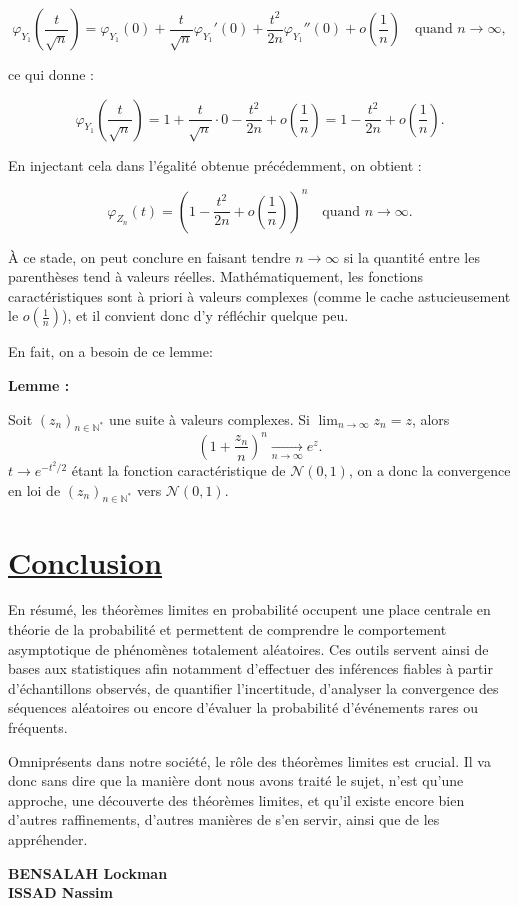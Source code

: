 \documentclass{article}
\begin{document}
\[
\varphi_{Y_1}\left(\frac{t}{\sqrt{n}}\right) = \varphi_{Y_1}(0) + \frac{t}{\sqrt{n}} \varphi_{Y_1}'(0) + \frac{t^2}{2n} \varphi_{Y_1}''(0) + o\left(\frac{1}{n}\right) \quad \text{quand } n \to \infty,
\]

ce qui donne :

\[
\varphi_{Y_1}\left(\frac{t}{\sqrt{n}}\right) = 1 + \frac{t}{\sqrt{n}} \cdot 0 - \frac{t^2}{2n} + o\left(\frac{1}{n}\right) = 1 - \frac{t^2}{2n} + o\left(\frac{1}{n}\right).
\]

En injectant cela dans l'égalité obtenue précédemment, on obtient :

\[
\varphi_{Z_n}(t) = \left( 1 - \frac{t^2}{2n} + o\left(\frac{1}{n}\right) \right)^n \quad \text{quand } n \to \infty.
\]

\noindent
À ce stade, on peut conclure en faisant tendre $n \to \infty$ si la quantité entre les parenthèses tend à valeurs réelles. Mathématiquement, les fonctions caractéristiques sont à priori à valeurs complexes (comme le cache astucieusement le $o\left(\frac{1}{n}\right)$), et il convient donc d'y réfléchir quelque peu.

\vspace{0.3cm}
\noindent
En fait, on a besoin de ce lemme:

\vspace{0.3cm}
\noindent
\textbf{Lemme :}

\vspace{0.3cm}
\noindent
Soit $(z_n)_{n \in \mathbb{N}^*}$ une suite à valeurs complexes. Si $\lim_{n \to \infty} z_n = z$, alors
\[
\left( 1 + \frac{z_n}{n} \right)^n \xrightarrow[n \to \infty]{} e^{z}.
\]
$t \rightarrow e^{-t^2/2}$ étant la fonction caractéristique de $\mathcal{N}(0,1)$, on a donc la convergence en loi de $(z_n)_{n \in \mathbb{N}^*}$ vers $\mathcal{N}(0,1)$.


\section*{\underline{Conclusion}}

En résumé, les théorèmes limites en probabilité occupent une place centrale en théorie de la probabilité et permettent de comprendre le comportement asymptotique de phénomènes totalement aléatoires. Ces outils servent ainsi de bases aux statistiques afin notamment d'effectuer des inférences fiables à partir d'échantillons observés, de quantifier l'incertitude, d'analyser la convergence des séquences aléatoires ou encore d'évaluer la probabilité d'événements rares ou fréquents.

\vspace{0.3cm}
\noindent
Omniprésents dans notre société, le rôle des théorèmes limites est crucial. Il va donc sans dire que la manière dont nous avons traité le sujet, n'est qu'une approche, une découverte des théorèmes limites, et qu'il existe encore bien d'autres raffinements, d'autres manières de s'en servir, ainsi que de les appréhender.

\bigskip
\bigskip 
\begin{flushright}
\textbf{BENSALAH Lockman}\\
\textbf{ISSAD Nassim}
\end{flushright}
\end{document}
